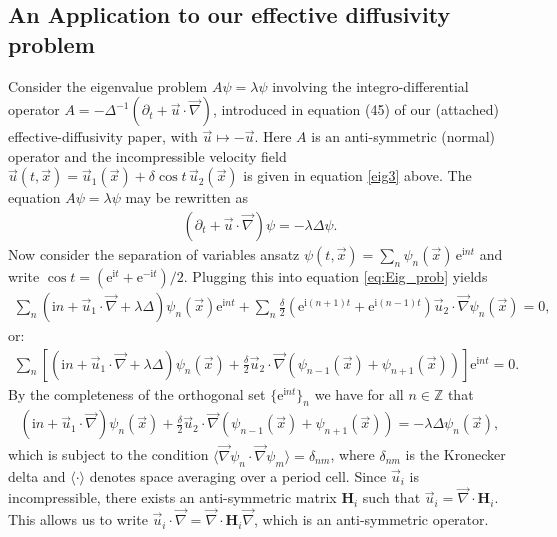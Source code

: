 \documentclass{article}
\newcommand{\e}{\mathrm{e}}
\newcommand{\I}{\mathrm{i}}
\newcommand{\Hb}{\mathbf{H}}
\begin{document}
\subsection{An Application to our effective diffusivity problem}
%
Consider the eigenvalue problem $A\psi=\lambda\psi$ involving the
integro-differential operator $A=-\Delta^{-1}(\partial_t+\vec{u}\cdot\vec{\nabla})$, 
introduced in equation (45) of our (attached) effective-diffusivity
paper, with $\vec{u}\mapsto-\vec{u}$. Here $A$ is an anti-symmetric (normal)
operator and the incompressible velocity field
$\vec{u}(t,\vec{x})=\vec{u}_1(\vec{x})+\delta\cos{t}\,\vec{u}_2(\vec{x})$
is given in equation \eqref{eig3} above. The equation $A\psi=\lambda\psi$ may be
rewritten as     
%
\begin{align}\label{eq:Eig_prob}
  (\partial_t+\vec{u}\cdot\vec{\nabla})\psi=-\lambda\Delta\psi.
\end{align}
%
Now consider the separation of variables ansatz
$\psi(t,\vec{x})=\sum_n\psi_n(\vec{x})\,\e^{\I nt}$ and write 
$\cos{t}=(\e^{\I t}+\e^{-\I t})/2$. Plugging this into equation
\eqref{eq:Eig_prob} 
yields 
%
\begin{align}
  \sum_n(\I n + \vec{u}_1\cdot\vec{\nabla}+\lambda\Delta)\psi_n(\vec{x})\e^{\I nt}
 +\sum_n\frac{\delta}{2}(\e^{\I(n+1)t}+\e^{\I(n-1)t})\vec{u}_2\cdot\vec{\nabla}\psi_n(\vec{x})=0,
\end{align}
%
or:
%
\begin{align}
  \sum_n\left[(\I n + \vec{u}_1\cdot\vec{\nabla}+\lambda\Delta)\psi_n(\vec{x})
 +\frac{\delta}{2}\vec{u}_2\cdot\vec{\nabla}(\psi_{n-1}(\vec{x})+\psi_{n+1}(\vec{x}))\right]\e^{\I nt}=0.
\end{align}
%
By the completeness of the orthogonal set $\{\e^{\I nt}\}_n$ we
have for all $n\in\mathbb{Z}$ that
%
\begin{align}\label{eq:Eig_prob_shift}
  (\I n + \vec{u}_1\cdot\vec{\nabla})\psi_n(\vec{x})
 +\frac{\delta}{2}\vec{u}_2\cdot\vec{\nabla}(\psi_{n-1}(\vec{x})+\psi_{n+1}(\vec{x}))=-\lambda\Delta\psi_n(\vec{x}),
\end{align}
%
which is subject to the condition $\langle\vec{\nabla}\psi_n\cdot\vec{\nabla}\psi_m\rangle=\delta_{nm}$, where
$\delta_{nm}$ is the Kronecker delta and $\langle\cdot\rangle$ denotes space averaging
over a period cell. Since $\vec{u}_i$ is incompressible, there exists
an anti-symmetric matrix $\Hb_i$ such that
$\vec{u}_i=\vec{\nabla}\cdot\Hb_i$. This allows us to write
$\vec{u}_i\cdot\vec{\nabla}=\vec{\nabla}\cdot\Hb_i\vec{\nabla}$, which is an anti-symmetric
operator.    
\end{document}
